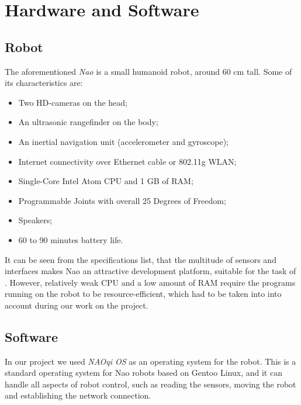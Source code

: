 \chapter{Hardware and Software}

\section{Robot}

The aforementioned \textit{Nao} \cite{nao} is a small humanoid robot, around 60
cm tall. Some of its characteristics are:

\begin{itemize}

\item Two HD-cameras on the head;

\item An ultrasonic rangefinder on the body;

\item An inertial navigation unit (accelerometer and gyroscope);

\item Internet connectivity over Ethernet cable or 802.11g WLAN;

\item Single-Core Intel Atom CPU and 1 GB of RAM;

\item Programmable Joints with overall 25 Degrees of Freedom;

\item Speakers;

\item 60 to 90 minutes battery life.

\end{itemize}

It can be seen from the specifications list, that the multitude of sensors and
interfaces makes Nao an attractive development platform, suitable for the task
of . However, relatively weak CPU and a low amount of RAM require
the programs running on the robot to be resource-efficient, which had to be
taken into into account during our work on the project.

\section{Software}

In our project we used \textit{NAOqi OS} as an operating system for the robot.
This is a standard operating system for Nao robots based on Gentoo Linux, and
it can handle all aspects of robot control, such as reading the sensors, moving
the robot and establishing the network connection.

